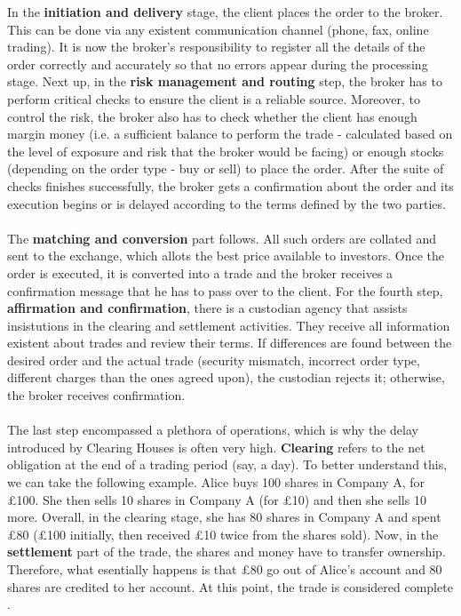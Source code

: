 \documentclass[12pt,twoside]{article}
\begin{document}
In the \textbf{initiation and delivery} stage, the client places the order to the broker. This can be done via any existent communication channel (phone, fax, online trading). It is now the broker's responsibility to register all the details of the order correctly and accurately so that no errors appear during the processing stage. Next up, in the \textbf{risk management and routing} step, the broker has to perform critical checks to ensure the client is a reliable source. Moreover, to control the risk, the broker also has to check whether the client has enough margin money (i.e. a sufficient balance to perform the trade - calculated based on the level of exposure and risk that the broker would be facing) or enough stocks (depending on the order type - buy or sell) to place the order. After the suite of checks finishes successfully, the broker gets a confirmation about the order and its execution begins or is delayed according to the terms defined by the two parties. 
\\ \\
The \textbf{matching and conversion} part follows. All such orders are collated and sent to the exchange, which allots the best price available to investors. Once the order is executed, it is converted into a trade and the broker receives a confirmation message that he has to pass over to the client. For the fourth step, \textbf{affirmation and confirmation}, there is a custodian agency that assists insistutions in the clearing and settlement activities. They receive all information existent about trades and review their terms. If differences are found between the desired order and the actual trade (security mismatch, incorrect order type, different charges than the ones agreed upon), the custodian rejects it; otherwise, the broker receives confirmation. 
\\ \\
The last step encompassed a plethora of operations, which is why the delay introduced by Clearing Houses is often very high. \textbf{Clearing} refers to the net obligation at the end of a trading period (say, a day). To better understand this, we can take the following example. Alice buys 100 shares in Company A, for \pounds 100. She then sells 10 shares in Company A (for \pounds 10) and then she sells 10 more. Overall, in the clearing stage, she has 80 shares in Company A and spent \pounds 80 (\pounds 100 initially, then received \pounds 10 twice from the shares sold). Now, in the \textbf{settlement} part of the trade, the shares and money have to transfer ownership. Therefore, what esentially happens is that \pounds 80 go out of Alice's account and 80 shares are credited to her account. At this point, the trade is considered complete \cite{TradeCycle2}.
\end{document}
